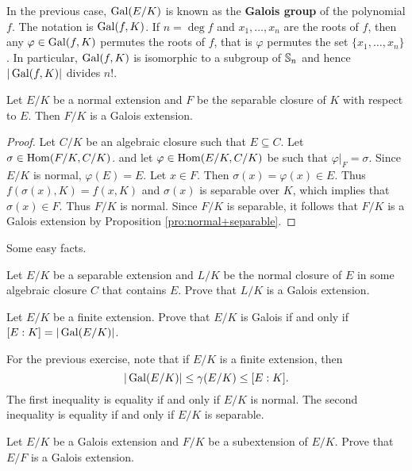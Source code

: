 In the previous case, $\operatorname{Gal}(E/K)$ is known as the \textbf{Galois group}
of the polynomial $f$. The notation is $\operatorname{Gal}(f,K)$. If $n=\deg f$ and
$x_1,\dots,x_n$ are the roots of $f$, then any 
$\varphi\in\operatorname{Gal}(f,K)$ permutes the roots of $f$, that is
$\varphi$ permutes the 
set $\{x_1,\dots,x_n\}$. In particular, $\operatorname{Gal}(f,K)$ is isomorphic to a subgroup of
$\mathbb{S}_n$ and hence $|\operatorname{Gal}(f,K)|$ divides $n!$. 

\begin{proposition}
    Let $E/K$ be a normal extension and $F$ be the separable
    closure of $K$ with respect to $E$. 
    Then $F/K$ is a Galois extension.
\end{proposition}

\begin{proof} 
    Let $C/K$ be an algebraic closure such that $E\subseteq C$. Let $\sigma\in\operatorname{Hom}(F/K,C/K)$. 
    and let $\varphi\in\operatorname{Hom}(E/K,C/K)$ be such that $\varphi|_F=\sigma$. Since $E/K$ is normal, 
    $\varphi(E)=E$. Let $x\in F$. Then $\sigma(x)=\varphi(x)\in E$. Thus
    $f(\sigma(x),K)=f(x,K)$ and $\sigma(x)$ is separable over $K$, which 
    implies that $\sigma(x)\in F$. Thus $F/K$ is normal. Since $F/K$ is separable, it follows
    that $F/K$ is a Galois extension by Proposition \ref{pro:normal+separable}.
\end{proof}

Some easy facts.

\begin{exercise}
    Let $E/K$ be a separable extension and $L/K$ be the normal 
    closure of $E$ in some algebraic closure $C$
    that contains $E$. Prove that $L/K$ is a Galois extension.
\end{exercise}

\begin{exercise}
    Let $E/K$ be a finite extension. Prove that $E/K$ is Galois
    if and only if $[E:K]=|\operatorname{Gal}(E/K)|$.
\end{exercise}

For the previous exercise, 
note that if $E/K$ is a finite extension, then  
\[
|\operatorname{Gal}(E/K)|\leq\gamma(E/K)\leq [E:K].
\]
The first inequality
is equality if and only if $E/K$ is normal. The second
inequality is equality if and only if $E/K$ is separable.

\begin{exercise}
    Let $E/K$ be a Galois extension and $F/K$ be a subextension of $E/K$. 
    Prove that $E/F$ is a Galois extension. 
\end{exercise}


